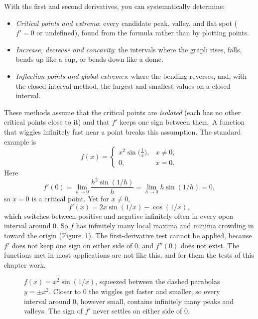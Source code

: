 \begin{connectionbox}
With the first and second derivatives, you can systematically determine:
\begin{itemize}
  \item \emph{Critical points and extrema}: every candidate peak, valley, and flat spot ($f'=0$ or undefined), found from the formula rather than by plotting points.
  \item \emph{Increase, decrease and concavity}: the intervals where the graph rises, falls, bends up like a cup, or bends down like a dome.
  \item \emph{Inflection points and global extremes}: where the bending reverses, and, with the closed-interval method, the largest and smallest values on a closed interval.
\end{itemize}

These methods assume that the critical points are \emph{isolated} (each has no other critical points close to it) and that $f'$ keeps one sign between them. A function that wiggles infinitely fast near a point breaks this assumption. The standard example is
\[
  f(x) = \begin{cases} x^2 \sin\big(\tfrac{1}{x}\big), & x \ne 0, \\ 0, & x = 0. \end{cases}
\]
Here
\[
f'(0) = \lim_{h\to 0} \frac{h^2 \sin(1/h)}{h} = \lim_{h\to 0} h\sin(1/h) = 0,
\]
so $x=0$ is a critical point. Yet for $x \ne 0$,
\[
f'(x) = 2x\sin(1/x) - \cos(1/x),
\]
which switches between positive and negative infinitely often in every open interval around $0$. So $f$ has infinitely many local maxima and minima crowding in toward the origin (Figure~\ref{ch16:fig-wiggle}). The first-derivative test cannot be applied, because $f'$ does not keep one sign on either side of $0$, and $f''(0)$ does not exist. The functions met in most applications are not like this, and for them the tests of this chapter work.
\end{connectionbox}

\begin{figure}[htbp]
\centering
{}
\caption{$f(x)=x^2\sin(1/x)$, squeezed between the dashed parabolas $y=\pm x^2$.
Closer to $0$ the wiggles get faster and smaller, so every interval around $0$,
however small, contains infinitely many peaks and valleys. The sign of $f'$ never
settles on either side of $0$.}
\label{ch16:fig-wiggle}
\end{figure}

